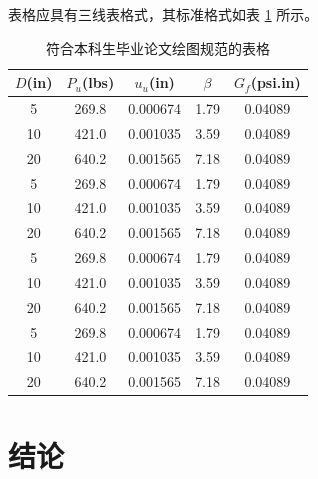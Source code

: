 表格应具有三线表格式，其标准格式如表 \ref{tab:table1} 所示。
\begin{table}[htbp]
\caption{符合本科生毕业论文绘图规范的表格}\label{tab:table1}
\vspace{0.5em}\centering\wuhao
\begin{tabular}{ccccc}
\toprule[1.5pt]
$D$(in) & $P_u$(lbs) & $u_u$(in) & $\beta$ & $G_f$(psi.in)\\
\midrule[1pt]
 5 & 269.8 & 0.000674 & 1.79 & 0.04089\\
10 & 421.0 & 0.001035 & 3.59 & 0.04089\\
20 & 640.2 & 0.001565 & 7.18 & 0.04089\\
 5 & 269.8 & 0.000674 & 1.79 & 0.04089\\
10 & 421.0 & 0.001035 & 3.59 & 0.04089\\
20 & 640.2 & 0.001565 & 7.18 & 0.04089\\
 5 & 269.8 & 0.000674 & 1.79 & 0.04089\\
10 & 421.0 & 0.001035 & 3.59 & 0.04089\\
20 & 640.2 & 0.001565 & 7.18 & 0.04089\\
 5 & 269.8 & 0.000674 & 1.79 & 0.04089\\
10 & 421.0 & 0.001035 & 3.59 & 0.04089\\
20 & 640.2 & 0.001565 & 7.18 & 0.04089\\
\bottomrule[1.5pt]
\end{tabular}
\vspace{\baselineskip}
\end{table}



\chapter*{结\quad 论}



